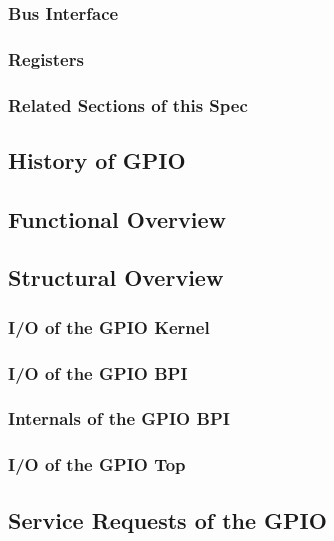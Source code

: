 \subsubsection{Bus Interface}

\subsubsection{Registers}

\subsubsection{Related Sections of this Spec}

\subsection{History of GPIO}

\subsection{Functional Overview}
\label{subsec:gpiofunc01}

\subsection{Structural Overview}



\subsubsection{I/O of the GPIO Kernel}

\subsubsection{I/O of the GPIO BPI}

\subsubsection{Internals of the GPIO BPI}

\subsubsection{I/O of the GPIO Top}

\subsection{Service Requests of the GPIO}

